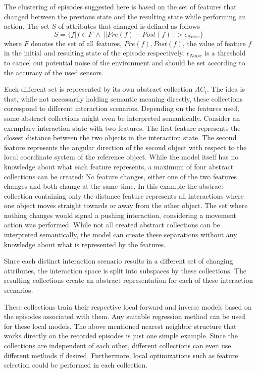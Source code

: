 The clustering of episodes suggested here is based on the set of features that changed between the previous state and the resulting state while performing an action. The set $S$ of attributes that changed is defined as follows 
\begin{equation}
S = \{f | f \in F ~ \wedge ~ ||Pre(f)-Post(f)|| > \epsilon_{Noise}\}
\end{equation}
where $F$ denotes the set of all features, $Pre(f), Post(f)$, the value of 
feature $f$ in the initial and resulting state of the episode respectively. $\epsilon_{Noise}$ is a threshold to cancel out potential noise of the environment and should be set according to the accuracy of the used sensors.

Each different set is represented by its own abstract collection $AC_i$. The 
idea is that, while not necessarily holding semantic meaning directly, these collections correspond to different interaction scenarios. Depending on the features used, some abstract collections might even be interpreted semantically.
Consider an exemplary interaction state with two features. The first feature represents the closest distance between the two objects in the interaction state. The second feature represents the angular direction of the second object with respect to the local coordinate system of the reference object. While the model itself has no knowledge about what each feature represents, a maximum of four abstract collections can be created: No feature changes, either one of the two features changes and both change at the same time. In this example the abstract collection containing only the distance feature represents all interactions where one object moves straight towards or away from the other object. The set where nothing changes would signal a pushing interaction, considering a movement action was performed. While not all created abstract collections can be interpreted semantically, the model can create these separations without any knowledge about what is represented by the features.

Since each distinct interaction scenario results in a different set of changing attributes, the interaction space is split into subspaces by these collections. The resulting collections create an abstract representation for each of these interaction scenarios. 

These collections train their respective local forward and inverse models based on the episodes associated with them. Any suitable regression method can be used for these local models. The above mentioned nearest neighbor structure that works directly on the recorded episodes is just one simple example. Since the collections are independent of each other, different collections can even use different methods if desired. Furthermore, local optimizations such as feature selection could be performed in each collection. %

